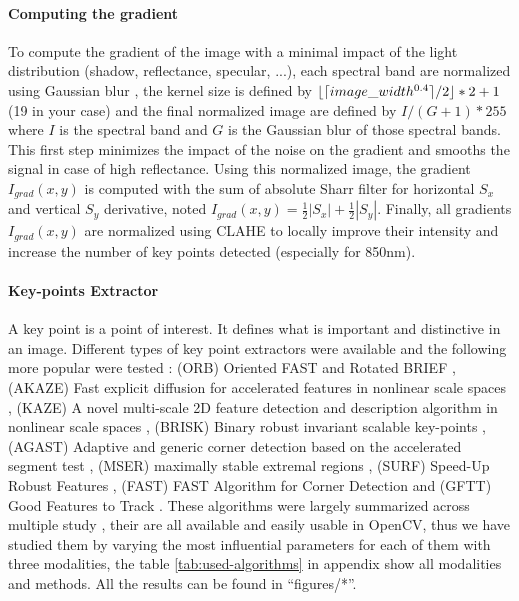 \documentclass[]{elsarticle}
\DeclarePairedDelimiter\ceil{\lceil}{\rceil}
\DeclarePairedDelimiter\floor{\lfloor}{\rfloor}
\begin{document}
	\paragraph{Computing the gradient} \label{sec:pre-processing} To compute the gradient of the image with a minimal impact of the light distribution (shadow, reflectance, specular, ...),
	each spectral band are normalized using Gaussian blur \cite{sage0303}, the kernel size is defined by $\floor{\ceil{image\_width^{0.4}}/2} * 2 +1$ (19 in your case)
	and the final normalized image are defined by $I/(G+1)*255$ where $I$ is the spectral band and $G$ is the Gaussian blur of those spectral bands.
	This first step minimizes the impact of the noise on the gradient and smooths the signal in case of high reflectance.
	Using this normalized image, the gradient $I_{grad}(x,y)$ is computed with the sum of absolute Sharr filter \cite{Seitz}
	for horizontal $S_x$ and vertical $S_y$ derivative, noted $I_{grad}(x,y)=\frac{1}{2}|S_x|+\frac{1}{2}|S_y|$.
	Finally, all gradients $I_{grad}(x,y)$ are normalized using CLAHE \cite{zuiderveld1994contrast} to locally improve their intensity and increase the number of key points detected (especially for 850nm).
	
	\paragraph{Key-points Extractor}
	
	A key point is a point of interest. It defines what is important and distinctive in an image.
	Different types of key point extractors were available and the following more popular were tested :
	(ORB) Oriented FAST and Rotated BRIEF \cite{Rublee:2011:OEA:2355573.2356268}, 
	(AKAZE) Fast explicit diffusion for accelerated features in nonlinear scale spaces \cite{alcantarilla2011fast}, 
	(KAZE) A novel multi-scale 2D feature detection and description algorithm in nonlinear scale spaces \cite{rs10050756}, 
	(BRISK) Binary robust invariant scalable key-points \cite{leutenegger2011brisk}, 
	(AGAST) Adaptive and generic corner detection based on the accelerated segment test \cite{mair2010adaptive}, 
	(MSER) maximally stable extremal regions \cite{donoser2006efficient}, 
	(SURF) Speed-Up Robust Features \cite{bay2006surf}, 
	(FAST) FAST Algorithm for Corner Detection \cite{trajkovic1998fast}
	and (GFTT) Good Features to Track \cite{shi1994good}.
	These algorithms were largely summarized across multiple study \cite{DantasDiasJunior, Tareen2018ACA, Zhang2016EXTENSIONAE, ali2016comparison},
	their are all available and easily usable in OpenCV, thus we have studied them by varying the most influential parameters for each of them with three modalities,
	the table \ref{tab:used-algorithms} in appendix show all modalities and methods.
	All the results can be found in ``figures/*''.
	
\end{document}
